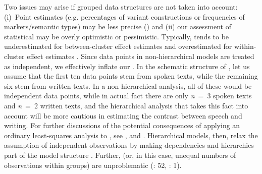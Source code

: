 Two issues may arise if grouped data structures are not taken into account:
(i)~Point estimates (e.g. percentages of variant constructions or frequencies of markers\slash semantic types) may be less precise (\citealt{SönningSchlüter2022}) and
(ii) our assessment of statistical  may be overly optimistic or pessimistic. Typically,  tends to be underestimated for between-cluster effect estimates and overestimated for within-cluster effect estimates \citep[489]{Agresti2013}. Since data points in non-hierarchical models are treated as independent, we effectively inflate our . In the schematic structure of , let us assume that the first ten data points stem from spoken texts, while the remaining six stem from written texts. In a non-hierarchical analysis, all of these would be independent data points, while in actual fact there are only \textit{n}~=~3 spoken texts and \textit{n}~=~2 written texts, and the hierarchical analysis that takes this fact into account will be more cautious in estimating the contrast between speech and writing. For further discussions of the potential conse\-quences of applying an ordinary least-squares analysis to , see \citet[3]{Hox2010},    \citet[15–16]{SnijdersBosker1999} and \citet[6–7]{Luke2004}. Hierarchical models, then, relax the assumption of independent observations by making dependencies and hierarchies part of the model structure \citep[6]{Hox2010}. Further,  (or, in this case, unequal numbers of observations within groups) are unproblematic (\citealt{SnijdersBosker1999}: 52, \citealt{SpeelmanHeylenGeeraerts2018}: 1).


